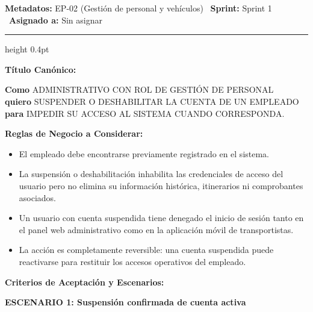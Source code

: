 \documentclass[a4paper,9pt]{article}
\begin{document}
\begin{tcolorbox}[hucard, title={\textbf{HU-66: SUSPENDER O DESHABILITAR PERSONAL} \hfill \scriptsize \colorbox{bluestatus}{\textbf{\ New\ }} \quad \colorbox{white}{\textcolor{primarydark}{\textbf{\ 2 pts\ }}}}]
\vspace{-1pt}
\noindent\textbf{\footnotesize Metadatos:} EP-02 (Gestión de personal y vehículos) \textbar\ \textbf{Sprint:} Sprint 1 \textbar\ \textbf{Asignado a:} Sin asignar\par\vspace{2pt}
\hrule height 0.4pt\par\vspace{3pt}
\noindent\textbf{\footnotesize Título Canónico:}\par\vspace{1pt}
{\small \textbf{Como} ADMINISTRATIVO CON ROL DE GESTIÓN DE PERSONAL \\ \textbf{quiero} SUSPENDER O DESHABILITAR LA CUENTA DE UN EMPLEADO \\ \textbf{para} IMPEDIR SU ACCESO AL SISTEMA CUANDO CORRESPONDA.}\par\vspace{3pt}
\noindent\textbf{\footnotesize Reglas de Negocio a Considerar:}\par\vspace{1pt}
{\footnotesize
\begin{itemize}[leftmargin=12pt, nosep, itemsep=1.5pt, topsep=1pt]
\item El empleado debe encontrarse previamente registrado en el sistema.
\item La suspensión o deshabilitación inhabilita las credenciales de acceso del usuario pero no elimina su información histórica, itinerarios ni comprobantes asociados.
\item Un usuario con cuenta suspendida tiene denegado el inicio de sesión tanto en el panel web administrativo como en la aplicación móvil de transportistas.
\item La acción es completamente reversible: una cuenta suspendida puede reactivarse para restituir los accesos operativos del empleado.
\end{itemize}
}\par\vspace{3pt}
\noindent\textbf{\footnotesize Criterios de Aceptación y Escenarios:}\par\vspace{2pt}
{\footnotesize
\noindent\textbf{\textcolor{secondarydark}{ESCENARIO 1:  Suspensión confirmada de cuenta activa}}\par\vspace{1pt}
}
\end{tcolorbox}
\end{document}
